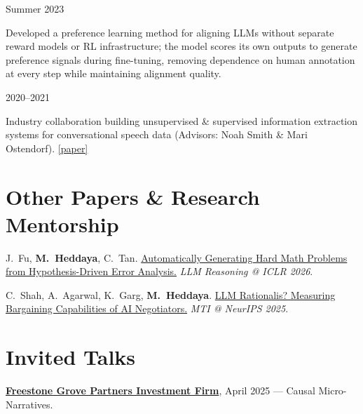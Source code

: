 \documentclass[11pt,letterpaper]{article}
\begin{document}
\vspace{4pt}
 \hfill Summer 2023
\begin{cvitems}
    \item Developed a preference learning method for aligning LLMs without separate reward models or RL infrastructure; the model scores its own outputs to generate preference signals during fine-tuning, removing dependence on human annotation at every step while maintaining alignment quality.
\end{cvitems}

\vspace{4pt}
 \hfill 2020--2021
\begin{cvitems}
    \item Industry collaboration building unsupervised \& supervised information extraction systems for conversational speech data (Advisors: Noah Smith \& Mari Ostendorf). \href{https://arxiv.org/abs/2205.12967}{[paper]}
\end{cvitems}

\section*{Other Papers \& Research Mentorship}

\begin{cvitems}
    \item J.\ Fu, \textbf{M.\ Heddaya}, C.\ Tan. \href{https://openreview.net/forum?id=d1PcXKaAON}{Automatically Generating Hard Math Problems from Hypothesis-Driven Error Analysis.} \textit{LLM Reasoning @ ICLR 2026}.
    \item C.\ Shah, A.\ Agarwal, K.\ Garg, \textbf{M.\ Heddaya}. \href{https://neurips.cc/virtual/2025/loc/san-diego/128019}{LLM Rationalis? Measuring Bargaining Capabilities of AI Negotiators.} \textit{MTI @ NeurIPS 2025}.
\end{cvitems}

\section*{Invited Talks}

\href{https://fgrovep.com}{\textbf{Freestone Grove Partners Investment Firm}}, April 2025 --- Causal Micro-Narratives.

\vspace{4pt}
\end{document}
